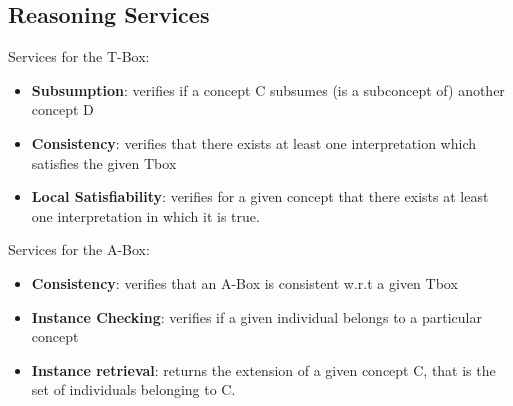 \documentclass[10pt,a4paper]{article}
\begin{document}
\subsection{Reasoning Services}
Services for the T-Box:
\begin{itemize}
	\item \textbf{Subsumption}: verifies if a concept C subsumes (is a subconcept of) another concept D
	\item \textbf{Consistency}: verifies that there exists at least one interpretation which satisfies the given Tbox
	\item \textbf{Local Satisfiability}: verifies for a given concept that there exists at least one interpretation in which it is true.
\end{itemize}
\pagebreak
Services for the A-Box:
\begin{itemize}
	\item \textbf{Consistency}: verifies that an A-Box is consistent w.r.t a given Tbox
	\item \textbf{Instance Checking}: verifies if a given individual belongs to a particular concept
	\item \textbf{Instance retrieval}: returns the extension of a given concept C, that is the set of individuals belonging to C.	
\end{itemize}
\end{document}

